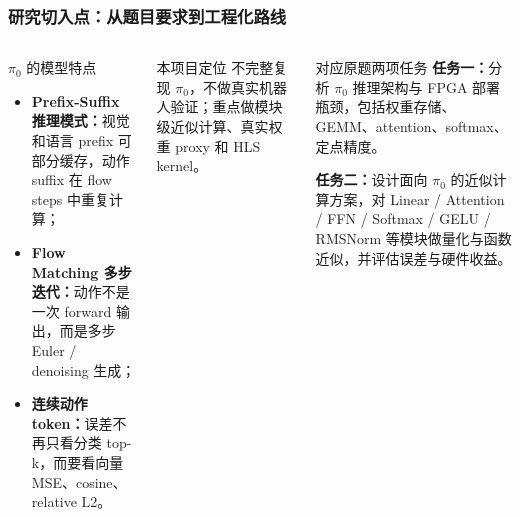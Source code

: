 \documentclass[10pt, aspectratio=169]{beamer}
\newcommand{\piZero}{\texorpdfstring{$\pi_0$}{pi0}\xspace}
\newcommand{\kw}[1]{\textbf{#1}}
\begin{document}
\begin{frame}
  \frametitle{研究切入点：从题目要求到工程化路线}
  \begin{columns}[T,onlytextwidth]
    \begin{block}{\piZero 的模型特点}
      \small
      \begin{itemize}
        \item \kw{Prefix-Suffix 推理模式：}视觉和语言 prefix 可部分缓存，动作 suffix 在 flow steps 中重复计算；
        \item \kw{Flow Matching 多步迭代：}动作不是一次 forward 输出，而是多步 Euler / denoising 生成；
        \item \kw{连续动作 token：}误差不再只看分类 top-k，而要看向量 MSE、cosine、relative L2。
      \end{itemize}
    \end{block}

    \begin{alertblock}{本项目定位}
      \small
      不完整复现 \piZero，不做真实机器人验证；重点做模块级近似计算、真实权重 proxy 和 HLS kernel。
    \end{alertblock}

    \begin{exampleblock}{对应原题两项任务}
      \footnotesize
      \kw{任务一：}分析 \piZero 推理架构与 FPGA 部署瓶颈，包括权重存储、GEMM、attention、softmax、定点精度。\vspace{5pt}

      \kw{任务二：}设计面向 \piZero 的近似计算方案，对 Linear / Attention / FFN / Softmax / GELU / RMSNorm 等模块做量化与函数近似，并评估误差与硬件收益。
    \end{exampleblock}
  \end{columns}
\end{frame}
\end{document}
